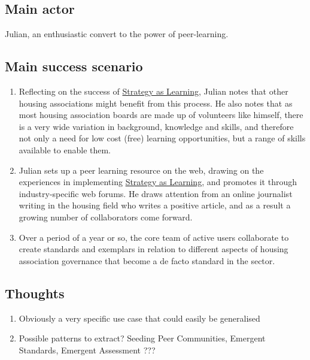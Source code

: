 \subsection{Main actor}

Julian, an enthusiastic convert to the power of peer-learning.

\subsection{Main success scenario}

\begin{enumerate}
\item
  Reflecting on the success of
  \href{http://socialmediaclassroom.com/host/peeragogy/forum/patterns-and-use-cases\#comment-1749}{Strategy
  as Learning}, Julian notes that other housing associations might
  benefit from this process. He also notes that as most housing
  association boards are made up of volunteers like himself, there is a
  very wide variation in background, knowledge and skills, and therefore
  not only a need for low cost (free) learning opportunities, but a
  range of skills available to enable them.
\item
  Julian sets up a peer learning resource on the web, drawing on the
  experiences in implementing
  \href{http://socialmediaclassroom.com/host/peeragogy/forum/patterns-and-use-cases\#comment-1749}{Strategy
  as Learning}, and promotes it through industry-specific web forums. He
  draws attention from an online journalist writing in the housing field
  who writes a positive article, and as a result a growing number of
  collaborators come forward.
\item
  Over a period of a year or so, the core team of active users
  collaborate to create standards and exemplars in relation to different
  aspects of housing association governance that become a de facto
  standard in the sector.
\end{enumerate}
\subsection{Thoughts}

\begin{enumerate}
\item
  Obviously a very specific use case that could easily be generalised
\item
  Possible patterns to extract? Seeding Peer Communities, Emergent
  Standards, Emergent Assessment ???
\end{enumerate}
